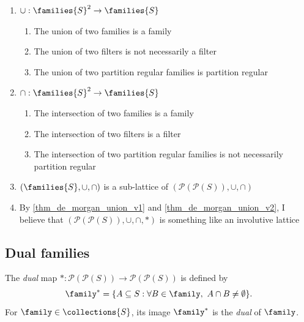 \begin{enumerate}
    \item $\cup: \families{S}^2 \to \families{S}$
    \begin{enumerate}
        \item The union of two families is a family
        \item The union of two filters is not necessarily a filter
        \item The union of two partition regular families is partition regular
    \end{enumerate}
    \item $\cap : \families{S}^2 \to \families{S}$
        \begin{enumerate}
        \item The intersection of two families is a family
        \item The intersection of two filters is a filter
        \item The intersection of two partition regular families is not necessarily partition regular
    \end{enumerate}
    \item $(\families{S}, \cup, \cap)$ is a sub-lattice of $(\mathcal{P}(\mathcal{P}(S)),\cup,\cap)$
    \item By \cref{thm_de_morgan_union_v1} and \cref{thm_de_morgan_union_v2}, I believe that $(\mathcal{P}(\mathcal{P}(S)),\cup,\cap,*)$ is something like an involutive lattice
\end{enumerate}

\subsection{Dual families}

\begin{definition}
    The \emph{dual} map $*: \mathcal{P}(\mathcal{P}(S)) \to \mathcal{P}(\mathcal{P}(S))$ is defined by 
    \[\family^* = \{A \subseteq S : \forall B \in \family, \ A \cap B \neq \emptyset\}.\]
    For $\family \in \collections{S}$, its image $\family^*$ is the \emph{dual} of $\family$.
\end{definition}

\vskip0.5cm

